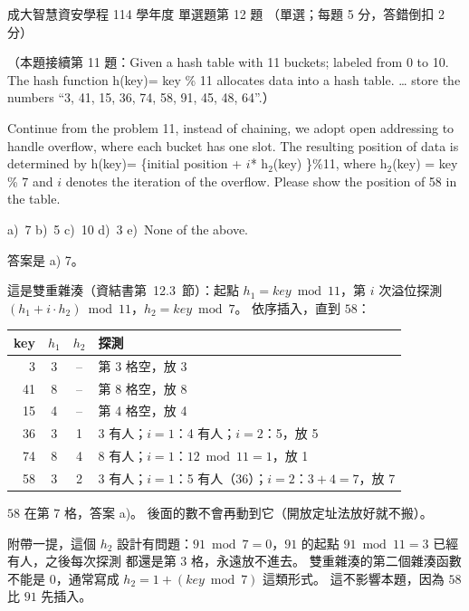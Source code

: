 \begin{pastexam}[label={px:ncku-114-isec-ds-12}]{成大智慧資安學程 114 學年度 單選題第 12 題}
（單選；每題 5 分，答錯倒扣 2 分）

（本題接續第 11 題：Given a hash table with 11 buckets; labeled from 0 to 10. The hash function
h(key)= key \% 11 allocates data into a hash table. \ldots{} store the numbers ``3, 41, 15, 36, 74, 58, 91,
45, 48, 64''.）

Continue from the problem 11, instead of chaining, we adopt open addressing to handle overflow, where
each bucket has one slot. The resulting position of data is determined by h(key)= \{initial position +
$i$* h$_2$(key) \}\%11, where h$_2$(key) = key \% 7 and $i$ denotes the iteration of the overflow. Please
show the position of 58 in the table.

a)~7 \qquad b)~5 \qquad c)~10 \qquad d)~3 \qquad e)~None of the above.
\end{pastexam}

\begin{pastsoln}
答案是 a) 7。

這是雙重雜湊（資結書第~12.3~節）：起點 $h_1 = \mathit{key} \bmod 11$，第 $i$ 次溢位探測
$(h_1 + i \cdot h_2) \bmod 11$，$h_2 = \mathit{key} \bmod 7$。 依序插入，直到 $58$：
\begin{center}
\small
\begin{tabular}{rccl}
\toprule
key & $h_1$ & $h_2$ & 探測 \\
\midrule
3 & 3 & -- & 第 3 格空，放 3 \\
41 & 8 & -- & 第 8 格空，放 8 \\
15 & 4 & -- & 第 4 格空，放 4 \\
36 & 3 & 1 & 3 有人；$i = 1$：4 有人；$i = 2$：5，放 5 \\
74 & 8 & 4 & 8 有人；$i = 1$：$12 \bmod 11 = 1$，放 1 \\
58 & 3 & 2 & 3 有人；$i = 1$：5 有人（36）；$i = 2$：$3 + 4 = 7$，放 7 \\
\bottomrule
\end{tabular}
\end{center}
$58$ 在第 $7$ 格，答案 a)。 後面的數不會再動到它（開放定址法放好就不搬）。

附帶一提，這個 $h_2$ 設計有問題：$91 \bmod 7 = 0$，$91$ 的起點 $91 \bmod 11 = 3$ 已經有人，之後每次探測
都還是第 $3$ 格，永遠放不進去。 雙重雜湊的第二個雜湊函數不能是 $0$，通常寫成
$h_2 = 1 + (\mathit{key} \bmod 7)$ 這類形式。 這不影響本題，因為 $58$ 比 $91$ 先插入。
\end{pastsoln}

